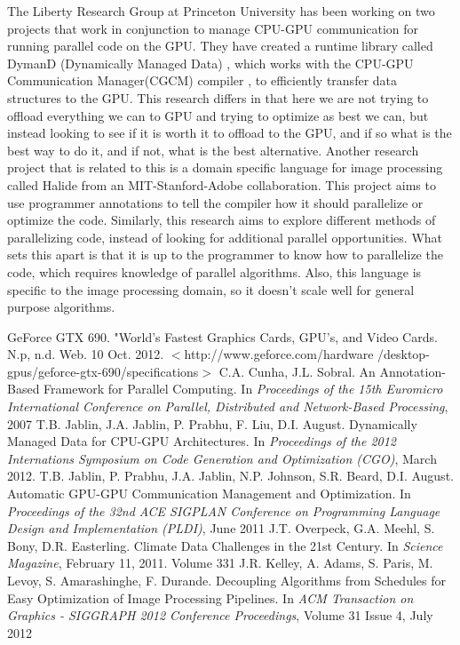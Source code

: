 \documentclass[a4paper,12pt]{article}
\begin{document}
The Liberty Research Group at Princeton University has been working on two projects that work in conjunction to manage CPU-GPU communication for running parallel code on the GPU.  They have created a runtime library called DymanD (Dynamically Managed Data) \cite{dymand}, which works with the CPU-GPU Communication Manager(CGCM) compiler \cite{cgcm}, to efficiently transfer data structures to the GPU.  This research differs in that here we are not trying to offload everything we can to GPU and trying to optimize as best we can, but instead looking to see if it is worth it to offload to the GPU, and if so what is the best way to do it, and if not, what is the best alternative.  Another research project that is related to this is a domain specific language for image processing called Halide from an MIT-Stanford-Adobe collaboration\cite{halide}.  This project aims to use programmer annotations to tell the compiler how it should parallelize or optimize the code.  Similarly, this research aims to explore different methods of parallelizing code, instead of looking for additional parallel opportunities.  What sets this apart is that it is up to the programmer to know how to parallelize the code, which requires knowledge of parallel algorithms.  Also, this language is specific to the image processing domain, so it doesn't scale well for general purpose algorithms.
\newpage
\begin{thebibliography}{9}
 GeForce GTX 690. "World's Fastest Graphics Cards, GPU's, and Video Cards. N.p, n.d. Web. 10 Oct. 2012.
 $<$http://www.geforce.com/hardware /desktop-gpus/geforce-gtx-690/specifications$>$
 C.A. Cunha, J.L. Sobral. An Annotation-Based Framework for Parallel Computing. In \textit{Proceedings of the 15th Euromicro International Conference on Parallel, Distributed and Network-Based Processing}, 2007
 T.B. Jablin, J.A. Jablin, P. Prabhu, F. Liu, D.I. August. Dynamically Managed Data for CPU-GPU Architectures. In \textit{Proceedings of the 2012 Internations Symposium on Code Generation and Optimization (CGO)}, March 2012.
T.B. Jablin, P. Prabhu, J.A. Jablin, N.P. Johnson, S.R. Beard, D.I. August. Automatic GPU-GPU Communication Management and Optimization. In \textit{Proceedings of the 32nd ACE SIGPLAN Conference on Programming Language Design and Implementation (PLDI)}, June 2011
 J.T. Overpeck, G.A. Meehl, S. Bony, D.R. Easterling.  Climate Data Challenges in the 21st Century.  In \textit{Science Magazine}, February 11, 2011.  Volume 331
 J.R. Kelley, A. Adams, S. Paris, M. Levoy, S. Amarashinghe, F. Durande.  Decoupling Algorithms from Schedules for Easy Optimization of Image Processing Pipelines.  In \textit{ACM Transaction on Graphics - SIGGRAPH 2012 Conference Proceedings}, Volume 31 Issue 4, July 2012
\end{thebibliography}
\end{document}
